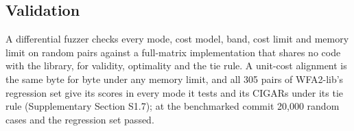 \subsection{Validation}

A differential fuzzer checks every mode, cost model, band, cost limit and memory limit on random pairs against a full-matrix implementation that shares no code with the library, for validity, optimality and the tie rule. A unit-cost alignment is the same byte for byte under any memory limit, and all 305 pairs of WFA2-lib's regression set give its scores in every mode it tests and its CIGARs under its tie rule (Supplementary Section S1.7); at the benchmarked commit 20{,}000 random cases and the regression set passed.
